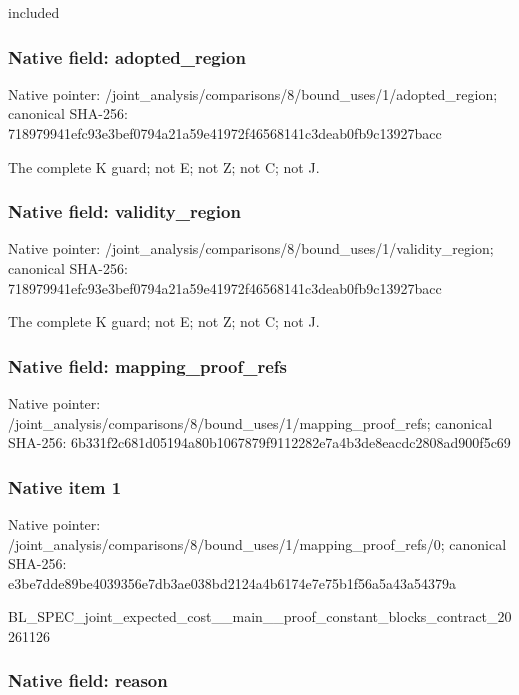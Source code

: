 \documentclass[10pt,a4paper]{article}
\begin{document}
included


\subsubsection{Native field: adopted\_region}


Native pointer: /joint\_analysis/comparis\allowbreak{}ons/8/bound\_uses/1/adopt\allowbreak{}ed\_region; canonical SHA-256: 718979941efc93e3bef0794a\allowbreak{}21a59e41972f46568141c3de\allowbreak{}ab0fb9c13927bacc


The complete K guard; not E; not Z; not C; not J.


\subsubsection{Native field: validity\_region}


Native pointer: /joint\_analysis/comparis\allowbreak{}ons/8/bound\_uses/1/valid\allowbreak{}ity\_region; canonical SHA-256: 718979941efc93e3bef0794a\allowbreak{}21a59e41972f46568141c3de\allowbreak{}ab0fb9c13927bacc


The complete K guard; not E; not Z; not C; not J.


\subsubsection{Native field: mapping\_proof\_refs}


Native pointer: /joint\_analysis/comparis\allowbreak{}ons/8/bound\_uses/1/mappi\allowbreak{}ng\_proof\_refs; canonical SHA-256: 6b331f2c681d05194a80b106\allowbreak{}7879f9112282e7a4b3de8eac\allowbreak{}dc2808ad900f5c69



\subsubsection{Native item 1}


Native pointer: /joint\_analysis/comparis\allowbreak{}ons/8/bound\_uses/1/mappi\allowbreak{}ng\_proof\_refs/0; canonical SHA-256: e3be7dde89be4039356e7db3\allowbreak{}ae038bd2124a4b6174e7e75b\allowbreak{}1f56a5a43a54379a


BL\_SPEC\_joint\_expected\_c\allowbreak{}ost\_\_main\_\_proof\_constan\allowbreak{}t\_blocks\_contract\_202611\allowbreak{}26


\subsubsection{Native field: reason}
\end{document}
